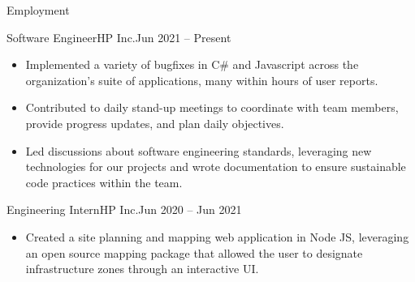\documentclass[]{mcdowellcv}
\begin{document}
\begin{cvsection}{Employment}
\begin{cvsubsection}{Software Engineer}{HP Inc.}{Jun 2021 -- Present}
\begin{itemize}
                \begin{itemize}%
                    \item Worked with subject matter experts on reverse engineering the original application. From that work, created a requirements document that has been leveraged on other projects.
                    \item Adapted prototype into a user interface with Blazor Webassembly and C\#.
                \end{itemize} 
            \item Implemented a variety of bugfixes in C\# and Javascript across the organization's suite of applications, many within hours of user reports.
            \item Contributed to daily stand-up meetings to coordinate with team members, provide progress updates, and plan daily objectives.
            \item Led discussions about software engineering standards, leveraging new technologies for our projects and wrote documentation to ensure sustainable code practices within the team.
            \end{itemize}    
    \end{cvsubsection}
    \vspace{-6pt}
    \begin{cvsubsection}{Engineering Intern}{HP Inc.}{Jun 2020 -- Jun 2021}
    \vspace{-4pt}
		\begin{itemize}%
            \item Created a site planning and mapping web application in Node JS, leveraging an open source mapping package that allowed the user to designate infrastructure zones through an interactive UI.
		  \end{itemize}
	   \end{cvsubsection}
        \end{cvsection}
        \vspace{-4pt}
\end{document}
